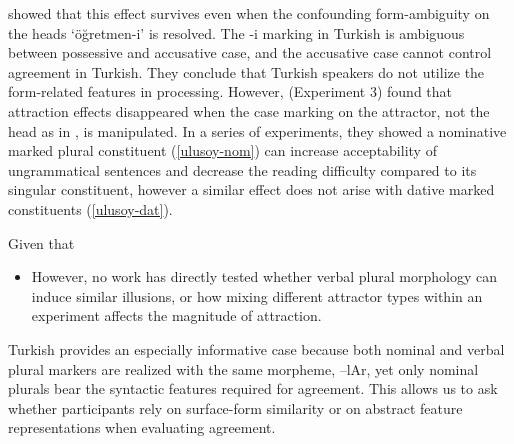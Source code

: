 \documentclass[
  authoryear,
  preprint]{elsarticle}
\providecommand{\tightlist}{%
  \setlength{\itemsep}{0pt}\setlength{\parskip}{0pt}}
\begin{document}
\citet{TurkLogacev2024} showed that this effect survives even when the
confounding form-ambiguity on the heads `öğretmen-i' is resolved. The -i
marking in Turkish is ambiguous between possessive and accusative case,
and the accusative case cannot control agreement in Turkish. They
conclude that Turkish speakers do not utilize the form-related features
in processing. However, \citet{Ulusoy2023} (Experiment 3) found that
attraction effects disappeared when the case marking on the attractor,
not the head as in \citet{TurkLogacev2024}, is manipulated. In a series
of experiments, they showed a nominative marked plural constituent
(\ref{ulusoy-nom}) can increase acceptability of ungrammatical sentences
and decrease the reading difficulty compared to its singular
constituent, however a similar effect does not arise with dative marked
constituents (\ref{ulusoy-dat}).

\begin{exe}
\ex  \label{ulusoy}
\begin{xlist}

\end{xlist}
\end{exe}

Given that

\begin{itemize}
\tightlist
\item
  However, no work has directly tested whether verbal plural morphology
  can induce similar illusions, or how mixing different attractor types
  within an experiment affects the magnitude of attraction.
\end{itemize}

Turkish provides an especially informative case because both nominal and
verbal plural markers are realized with the same morpheme, --lAr, yet
only nominal plurals bear the syntactic features required for agreement.
This allows us to ask whether participants rely on surface-form
similarity or on abstract feature representations when evaluating
agreement.
\end{document}
